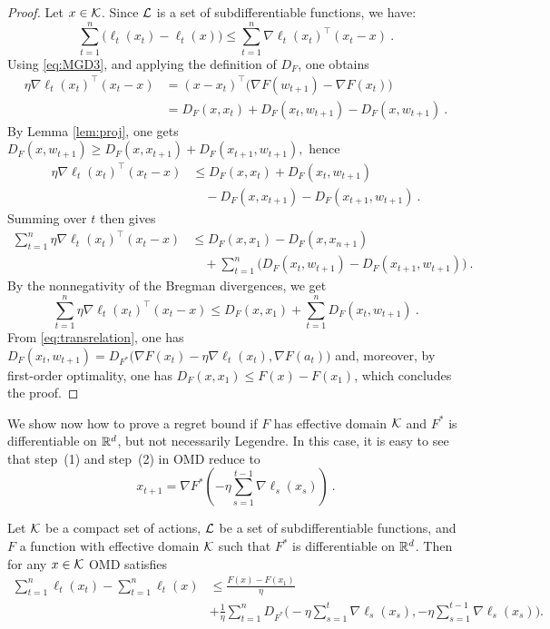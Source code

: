 \begin{proof}
Let $x \in \mathcal{K}$. Since $\mathcal{L}$ is a set of subdifferentiable functions, we have:
$$\sum_{t=1}^n \bigl( \ell_t(x_t) - \ell_t(x) \bigr) \leq \sum_{t=1}^n \nabla \ell_t(x_t)^{\top} (x_t -x)~.$$
Using \eqref{eq:MGD3}, and applying the definition of $D_F$, one obtains
  \begin{align*}
  \eta \nabla \ell_t(x_t)^{\top} (x_t - x) & = (x-x_t)^{\top} \big(\nabla F(w_{t+1}) - \nabla F(x_t) \big)\\
  & = D_F(x,x_t)+D_F(x_t,w_{t+1})-D_F(x,w_{t+1})~.
  \end{align*}
By Lemma \ref{lem:proj}, one gets 
  $D_F(x,w_{t+1}) \ge D_F(x,x_{t+1}) + D_F(x_{t+1},w_{t+1}),$ hence
  \begin{align*}
  \eta \nabla \ell_t(x_t)^{\top} (x_t - x) & \le D_F(x,x_t)+D_F(x_t,w_{t+1}) \\
& \quad -D_F(x,x_{t+1})-D_F(x_{t+1},w_{t+1})~.
  \end{align*}
Summing over $t$ then gives  
  \begin{align*}
  \sum_{t=1}^n \eta \nabla \ell_t(x_t)^{\top} (x_t - x) & \le D_F(x,x_1)-D_F(x,x_{n+1}) \\
& \quad +\sum_{t=1}^n \big(D_F(x_t,w_{t+1}) -D_F(x_{t+1},w_{t+1})\big)~.
  \end{align*}
By the nonnegativity of the Bregman divergences, we get 
$$\sum_{t=1}^n \eta \nabla \ell_t(x_t)^{\top} (x_t - x)
\le D_F(x,x_1)+\sum_{t=1}^n D_F(x_t,w_{t+1})~.$$
From \eqref{eq:transrelation}, one has
  $
  D_F(x_t,w_{t+1})=D_{F^*}\big(\nabla F(x_t)- \eta \nabla \ell_t(x_t),\nabla F(a_t)\big)
  $
and, moreover, by first-order optimality, one has $D_F(x,x_1) \leq F(x) - F(x_1)$, which concludes the proof.
\end{proof}
%
We show now how to prove a regret bound if $F$ has effective domain $\mathcal{K}$ and $F^*$ is differentiable on $\mathbb{R}^d$, but not necessarily Legendre. In this case, it is easy to see that step~(1) and step~(2) in OMD reduce to
\[
x_{t+1} = \nabla F^* \left( - \eta \sum_{s=1}^{t-1} \nabla \ell_s(x_s) \right)~.
\]
%
\begin{theorem} \label{th:Fnotlegendre}
Let $\mathcal{K}$ be a compact set of actions, $\mathcal{L}$ be a set of subdifferentiable functions, and $F$ a function with effective domain $\mathcal{K}$ such that $F^*$ is differentiable on $\mathbb{R}^d$. Then for any $x \in \mathcal{K}$ OMD satisfies
\begin{align*}
\sum_{t=1}^n \ell_t(x_t) - \sum_{t=1}^n \ell_t(x)
& \leq \frac{F(x) - F(x_1)}{\eta} \\
& + \frac{1}{\eta} \sum_{t=1}^n D_{F^*}\bigg(- \eta \sum_{s=1}^{t} \nabla \ell_s(x_s), - \eta \sum_{s=1}^{t-1} \nabla \ell_s(x_s) \bigg).
\end{align*}
\end{theorem}
